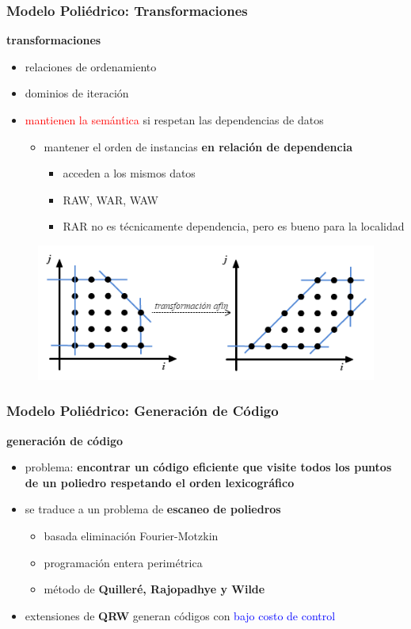\documentclass{beamer}\usetheme{Madrid} %
\begin{document}
\begin{frame}
\frametitle{Modelo Poliédrico: Transformaciones}
\textbf{transformaciones}
\begin{itemize}
	\item relaciones de ordenamiento
	\item dominios de iteración
	\item \textcolor{red}{mantienen la semántica} si respetan las dependencias de datos
	\begin{itemize}
		\item mantener el orden de instancias \textbf{en relación de dependencia}
		\begin{itemize}
			\item acceden a los mismos datos
			\item RAW, WAR, WAW
			\item RAR no es técnicamente dependencia, pero es bueno para la localidad
		\end{itemize}
	\end{itemize}
\end{itemize}
\begin{figure}
\includegraphics[scale=0.6]{img/poly_transf.png}
\end{figure}
\end{frame}
\begin{frame}
\frametitle{Modelo Poliédrico: Generación de Código}
\textbf{generación de código}
\begin{itemize}
\item problema: \textbf{encontrar un código eficiente que visite todos los puntos de un poliedro respetando el orden lexicográfico}
\item se traduce a un problema de \textbf{escaneo de poliedros}
\begin{itemize}
\item basada eliminación Fourier-Motzkin
\item programación entera perimétrica
\item método de \textbf{Quilleré, Rajopadhye y Wilde}
\end{itemize}
\item extensiones de \textbf{QRW} generan códigos con \textcolor{blue}{bajo costo de control}
\end{itemize}
\end{frame}
\end{document}
